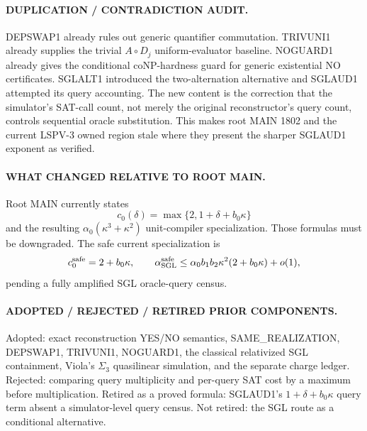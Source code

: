 \documentclass[11pt]{article}
\begin{document}
\paragraph{DUPLICATION / CONTRADICTION AUDIT.}
DEPSWAP1 already rules out generic quantifier commutation. TRIVUNI1 already supplies the trivial \(A\circ D_j\) uniform-evaluator baseline. NOGUARD1 already gives the conditional coNP-hardness guard for generic existential NO certificates. SGLALT1 introduced the two-alternation alternative and SGLAUD1 attempted its query accounting. The new content is the correction that the simulator's SAT-call count, not merely the original reconstructor's query count, controls sequential oracle substitution. This makes root MAIN 1802 and the current LSPV-3 owned region stale where they present the sharper SGLAUD1 exponent as verified.

\paragraph{WHAT CHANGED RELATIVE TO ROOT MAIN.}
Root MAIN currently states
\[
c_0(\delta)=\max\{2,1+\delta+b_0\kappa\}
\]
and the resulting \(\alpha_0(\kappa^3+\kappa^2)\) unit-compiler specialization. Those formulas must be downgraded. The safe current specialization is
\[
c_0^{\rm safe}=2+b_0\kappa,\qquad
\alpha_{\rm SGL}^{\rm safe}
\le\alpha_0b_1b_2\kappa^2(2+b_0\kappa)+o(1),
\]
pending a fully amplified SGL oracle-query census.

\paragraph{ADOPTED / REJECTED / RETIRED PRIOR COMPONENTS.}
Adopted: exact reconstruction YES/NO semantics, SAME\_REALIZATION, DEPSWAP1, TRIVUNI1, NOGUARD1, the classical relativized SGL containment, Viola's \(\Sigma_3\) quasilinear simulation, and the separate charge ledger. Rejected: comparing query multiplicity and per-query SAT cost by a maximum before multiplication. Retired as a proved formula: SGLAUD1's \(1+\delta+b_0\kappa\) query term absent a simulator-level query census. Not retired: the SGL route as a conditional alternative.
\end{document}
